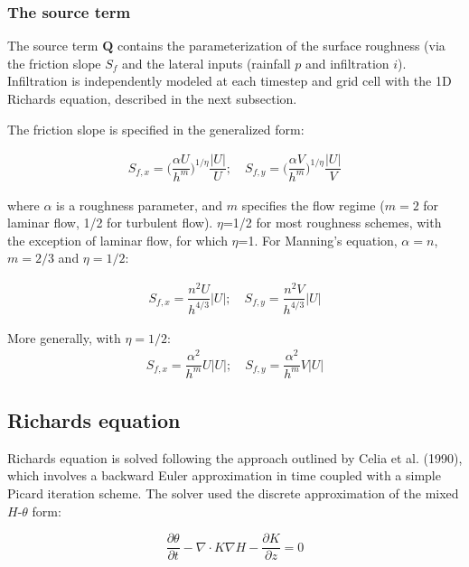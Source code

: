 \documentclass{article}
\begin{document}
\subsubsection*{The source term }

The source term $\mathbf{Q}$ contains the parameterization of the surface roughness (via the friction slope $S_f$  and the lateral inputs (rainfall $p$ and infiltration $i$).  Infiltration is independently modeled at each timestep and grid cell with the 1D Richards equation, described in the next subsection.
  
 The friction slope is specified in the generalized form: 

\begin{eqnarray} \nonumber
S_{f,x} = \bigg( \dfrac{\alpha  U}{h^m}\bigg)^{1/\eta} \dfrac{|U|}{U}; \quad
S_{f,y} = \bigg( \dfrac{\alpha  V}{h^m}\bigg)^{1/\eta} \dfrac{|U|}{V}
\end{eqnarray}

\noindent where $\alpha$ is a  roughness parameter, and $m$ specifies the flow regime ($m=2$ for laminar flow, 1/2 for turbulent flow).   $\eta$=1/2 for most roughness schemes, with the exception of laminar flow, for which $\eta$=1.  For Manning's equation, $\alpha = n$, $m=2/3$ and $\eta=1/2$:

\begin{eqnarray} \nonumber
S_{f,x} =  \dfrac{n^2 U}{h^{4/3}} |U|; \quad
S_{f,y} = \dfrac{n^2 V}{h^{4/3}} |U|
\end{eqnarray}

\noindent More generally, with $\eta=1/2$:
\begin{eqnarray} \nonumber
S_{f,x} = \dfrac{\alpha^2 }{h^m}  U |U|; \quad
S_{f,y} = \dfrac{\alpha^2 }{h^m} V |U|
\end{eqnarray}


\subsection{Richards equation}

Richards equation is solved following the approach outlined by Celia et al. (1990), which involves a backward Euler approximation in time coupled with a simple Picard iteration scheme.  
The solver used the discrete approximation of the  mixed $H$-$\theta$ form: 

\begin{equation} 
	\dfrac{\partial \theta}{\partial t} - \nabla \cdot K \nabla H - \dfrac{\partial K}{\partial z} = 0
\label{richards}
\end{equation}
\end{document}

